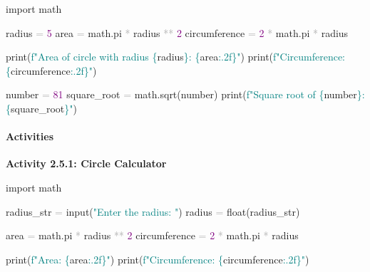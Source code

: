 \documentclass[
  justified,
  openright,
]{tufte-book}
\let\subsubsection\paragraph
\let\paragraph\paragraph
\newcommand{\BuiltInTok}[1]{#1}
\newcommand{\DecValTok}[1]{\textcolor{Purple}{#1}}
\newcommand{\ImportTok}[1]{\textcolor{BrandAccent}{#1}}
\newcommand{\NormalTok}[1]{#1}
\newcommand{\OperatorTok}[1]{\textcolor{DarkGray}{#1}}
\newcommand{\SpecialCharTok}[1]{\textcolor{Teal}{#1}}
\newcommand{\SpecialStringTok}[1]{\textcolor{Teal}{#1}}
\newcommand{\StringTok}[1]{\textcolor{Teal}{#1}}
\newenvironment{Shaded}{%
  \begin{snugshade}
}{%
  \end{snugshade}
}
\let\subsubsection\paragraph
\let\paragraph\paragraph
\begin{document}
\begin{Shaded}
\begin{Highlighting}[]
\ImportTok{import}\NormalTok{ math}

\NormalTok{radius }\OperatorTok{=} \DecValTok{5}
\NormalTok{area }\OperatorTok{=}\NormalTok{ math.pi }\OperatorTok{*}\NormalTok{ radius }\OperatorTok{**} \DecValTok{2}
\NormalTok{circumference }\OperatorTok{=} \DecValTok{2} \OperatorTok{*}\NormalTok{ math.pi }\OperatorTok{*}\NormalTok{ radius}

\BuiltInTok{print}\NormalTok{(}\SpecialStringTok{f"Area of circle with radius }\SpecialCharTok{\{}\NormalTok{radius}\SpecialCharTok{\}}\SpecialStringTok{: }\SpecialCharTok{\{}\NormalTok{area}\SpecialCharTok{:.2f\}}\SpecialStringTok{"}\NormalTok{)}
\BuiltInTok{print}\NormalTok{(}\SpecialStringTok{f"Circumference: }\SpecialCharTok{\{}\NormalTok{circumference}\SpecialCharTok{:.2f\}}\SpecialStringTok{"}\NormalTok{)}

\NormalTok{number }\OperatorTok{=} \DecValTok{81}
\NormalTok{square\_root }\OperatorTok{=}\NormalTok{ math.sqrt(number)}
\BuiltInTok{print}\NormalTok{(}\SpecialStringTok{f"Square root of }\SpecialCharTok{\{}\NormalTok{number}\SpecialCharTok{\}}\SpecialStringTok{: }\SpecialCharTok{\{}\NormalTok{square\_root}\SpecialCharTok{\}}\SpecialStringTok{"}\NormalTok{)}
\end{Highlighting}
\end{Shaded}

\subsubsection{Activities}\label{activities-6}

\textbf{Activity 2.5.1: Circle Calculator}

\begin{Shaded}
\begin{Highlighting}[]
\ImportTok{import}\NormalTok{ math}

\NormalTok{radius\_str }\OperatorTok{=} \BuiltInTok{input}\NormalTok{(}\StringTok{"Enter the radius: "}\NormalTok{)}
\NormalTok{radius }\OperatorTok{=} \BuiltInTok{float}\NormalTok{(radius\_str)}

\NormalTok{area }\OperatorTok{=}\NormalTok{ math.pi }\OperatorTok{*}\NormalTok{ radius }\OperatorTok{**} \DecValTok{2}
\NormalTok{circumference }\OperatorTok{=} \DecValTok{2} \OperatorTok{*}\NormalTok{ math.pi }\OperatorTok{*}\NormalTok{ radius}

\BuiltInTok{print}\NormalTok{(}\SpecialStringTok{f"Area: }\SpecialCharTok{\{}\NormalTok{area}\SpecialCharTok{:.2f\}}\SpecialStringTok{"}\NormalTok{)}
\BuiltInTok{print}\NormalTok{(}\SpecialStringTok{f"Circumference: }\SpecialCharTok{\{}\NormalTok{circumference}\SpecialCharTok{:.2f\}}\SpecialStringTok{"}\NormalTok{)}
\end{Highlighting}
\end{Shaded}
\end{document}
